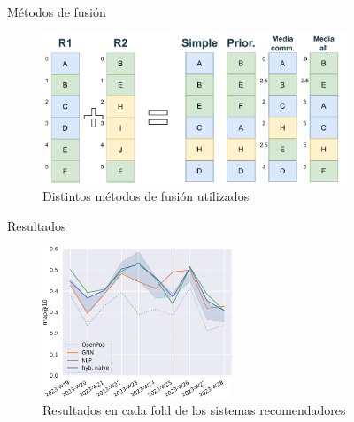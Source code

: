 \begin{frame}{Métodos de fusión}
    \begin{figure}
        \centering
        \includegraphics[height=45mm]{./images/diagrams/metodos-fusion.drawio.pdf}
        \caption{Distintos métodos de fusión utilizados}
    \end{figure}
\end{frame}

\begin{frame}{Resultados}
    \begin{figure}
        \centering
        \includegraphics[height=45mm]{./images/graphs/12_hybrid_merge_results_folds_Decentraland_W-THU_normalize=True_compare.pdf}
        \caption{Resultados en cada fold de los sistemas recomendadores}
    \end{figure}
\end{frame}